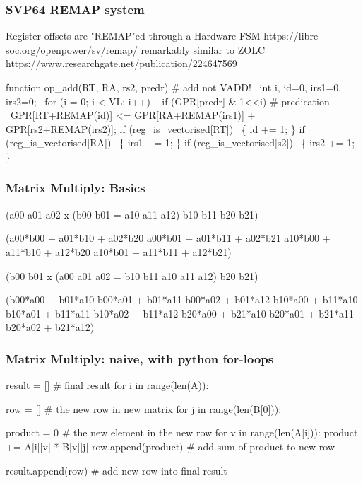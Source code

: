 \documentclass[slidestop]{beamer}
\begin{document}
\begin{frame}[fragile]
\frametitle{SVP64 REMAP system}

\begin{semiverbatim}
Register offsets are "REMAP"ed through a Hardware FSM
https://libre-soc.org/openpower/sv/remap/
remarkably similar to ZOLC
https://www.researchgate.net/publication/224647569

function op\_add(RT, RA, rs2, predr) # add not VADD!
  int i, id=0, irs1=0, irs2=0;
  for (i = 0; i < VL; i++)
    if (GPR[predr] & 1<<i) # predication
       GPR[RT+REMAP(id)] <= GPR[RA+REMAP(irs1)] +
                           GPR[rs2+REMAP(irs2)];
    if (reg\_is\_vectorised[RT])  \{ id += 1; \}
    if (reg\_is\_vectorised[RA])  \{ irs1 += 1; \}
    if (reg\_is\_vectorised[s2])  \{ irs2 += 1; \}
\end{semiverbatim}

\end{frame}

\begin{frame}[fragile]
\frametitle{Matrix Multiply: Basics}

\begin{semiverbatim}
(a00 a01 a02  x (b00 b01   =
 a10 a11 a12)    b10 b11
                 b20 b21)

(a00*b00 + a01*b10 + a02*b20 a00*b01 + a01*b11 + a02*b21
 a10*b00 + a11*b10 + a12*b20 a10*b01 + a11*b11 + a12*b21)

 (b00 b01    x (a00 a01 a02  =
  b10 b11       a10 a11 a12)
  b20 b21)

(b00*a00 + b01*a10  b00*a01 + b01*a11  b00*a02 + b01*a12
 b10*a00 + b11*a10  b10*a01 + b11*a11  b10*a02 + b11*a12
 b20*a00 + b21*a10  b20*a01 + b21*a11  b20*a02 + b21*a12)

\end{semiverbatim}

\end{frame}


\begin{frame}[fragile]
\frametitle{Matrix Multiply: naive, with python for-loops}

\begin{semiverbatim}
result = [] # final result
for i in range(len(A)):

  row = [] # the new row in new matrix
  for j in range(len(B[0])):

    product = 0 # the new element in the new row
    for v in range(len(A[i])):
        product += A[i][v] * B[v][j]
    row.append(product) # add sum of product to new row

  result.append(row) # add new row into final result
\end{semiverbatim}

\end{frame}
\end{document}
